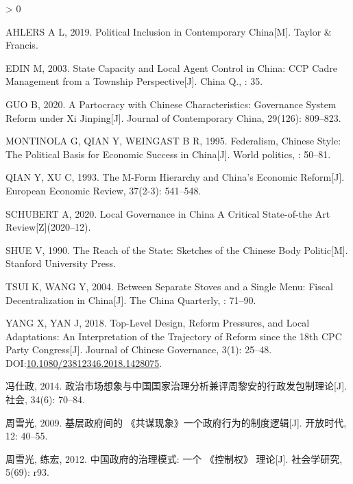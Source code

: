 \documentclass[
  12pt,
]{ctexart}
\newlength{\cslhangindent}
\newenvironment{CSLReferences}[2] %
 {%
  \setlength{\parindent}{0pt}
  \ifodd #1 \everypar{\setlength{\hangindent}{\cslhangindent}}\ignorespaces\fi
  \ifnum #2 > 0
  \setlength{\parskip}{#2\baselineskip}
  \fi
 }%
 {}
\begin{document}
\hypertarget{refs}{}
\begin{CSLReferences}{1}{0}
\leavevmode\hypertarget{ref-Ahlers2019}{}%
AHLERS A L, 2019. Political Inclusion in Contemporary {China}{[}M{]}. {Taylor \& Francis}.

\leavevmode\hypertarget{ref-Edin2003}{}%
EDIN M, 2003. State Capacity and Local Agent Control in {China}: {CCP} Cadre Management from a Township Perspective{[}J{]}. China Q., : 35.

\leavevmode\hypertarget{ref-Guo2020}{}%
GUO B, 2020. A {Partocracy} with {Chinese Characteristics}: {Governance System Reform} under {Xi Jinping}{[}J{]}. Journal of Contemporary China, 29(126): 809--823.

\leavevmode\hypertarget{ref-MontinolaEtAl1995}{}%
MONTINOLA G, QIAN Y, WEINGAST B R, 1995. Federalism, {Chinese} Style: The Political Basis for Economic Success in {China}{[}J{]}. World politics, : 50--81.

\leavevmode\hypertarget{ref-QianXu1993}{}%
QIAN Y, XU C, 1993. The {M}-Form Hierarchy and {China}'s Economic Reform{[}J{]}. European Economic Review, 37(2-3): 541--548.

\leavevmode\hypertarget{ref-Schubert2020}{}%
SCHUBERT A, 2020. Local {Governance} in {China} {} {A Critical State}-of-the {Art Review}{[}Z{]}(2020--12).

\leavevmode\hypertarget{ref-Shue1990}{}%
SHUE V, 1990. The Reach of the State: Sketches of the {Chinese} Body Politic{[}M{]}. {Stanford University Press}.

\leavevmode\hypertarget{ref-TsuiWang2004}{}%
TSUI K, WANG Y, 2004. Between Separate Stoves and a Single Menu: Fiscal Decentralization in {China}{[}J{]}. The China Quarterly, : 71--90.

\leavevmode\hypertarget{ref-YangYan2018}{}%
YANG X, YAN J, 2018. Top-Level Design, Reform Pressures, and Local Adaptations: An Interpretation of the Trajectory of Reform since the 18th {CPC Party Congress}{[}J{]}. Journal of Chinese Governance, 3(1): 25--48. DOI:\href{https://doi.org/10.1080/23812346.2018.1428075}{10.1080/23812346.2018.1428075}.

\leavevmode\hypertarget{ref-FengShiZheng2014}{}%
冯仕政, 2014. 政治市场想象与中国国家治理分析{}{}兼评周黎安的行政发包制理论{[}J{]}. 社会, 34(6): 70--84.

\leavevmode\hypertarget{ref-ZhouXueGuang2009}{}%
周雪光, 2009. 基层政府间的 {《共谋现象》}{}{}一个政府行为的制度逻辑{[}J{]}. 开放时代, 12: 40--55.

\leavevmode\hypertarget{ref-ZhouXueGuangLianHong2012}{}%
周雪光, 练宏, 2012. 中国政府的治理模式: 一个 {《控制权》} 理论{[}J{]}. 社会学研究, 5(69): r93.


\end{CSLReferences}
\end{document}
